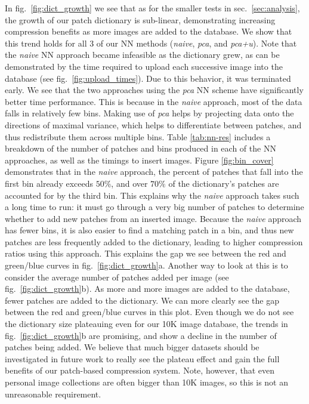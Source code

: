 In fig.~\ref{fig:dict_growth} we see that as for the smaller tests in sec.~\ref{sec:analysis}, the growth of our patch dictionary is sub-linear, demonstrating increasing compression benefits as more images are added to the database. We show that this trend holds for all 3 of our NN methods (\emph{naive}, \emph{pca}, and \emph{pca+u}). Note that the \emph{naive} NN approach became infeasible as the dictionary grew, as can be demonstrated by the time required to upload each successive image into the database (see fig.~\ref{fig:upload_times}). Due to this behavior, it was terminated early. We see that the two approaches using the \emph{pca} NN scheme have significantly better time performance. This is because in the \emph{naive} approach, most of the data falls in relatively few bins. Making use of \emph{pca} helps by projecting data onto the directions of maximal variance, which helps to differentiate between patches, and thus redistribute them across multiple bins. Table \ref{tab:nn-res} includes a breakdown of the number of patches and bins produced in each of the NN approaches, as well as the timings to insert images. Figure \ref{fig:bin_cover} demonstrates that in the \emph{naive} approach, the percent of patches that fall into the first bin already exceeds $50\%$, and over $70\%$ of the dictionary's patches are accounted for by the third bin. This explains why the \emph{naive} approach takes such a long time to run: it must go through a very big number of patches to determine whether to add new patches from an inserted image. Because the \emph{naive} approach has fewer bins, it is also easier to find a matching patch in a bin, and thus new patches are less frequently added to the dictionary, leading to higher compression ratios using this approach. This explains the gap we see between the red and green/blue curves in fig.~\ref{fig:dict_growth}a. Another way to look at this is to consider the average number of patches added per image (see fig.~\ref{fig:dict_growth}b). As more and more images are added to the database, fewer patches are added to the dictionary. We can more clearly see the gap between the red and green/blue curves in this plot. Even though we do not see the dictionary size plateauing even for our 10K image database, the trends in fig.~\ref{fig:dict_growth}b are promising, and show a decline in the number of patches being added. We believe that much bigger datasets should be investigated in future work to really see the plateau effect and gain the full benefits of our patch-based compression system. Note, however, that even personal image collections are often bigger than 10K images, so this is not an unreasonable requirement.

